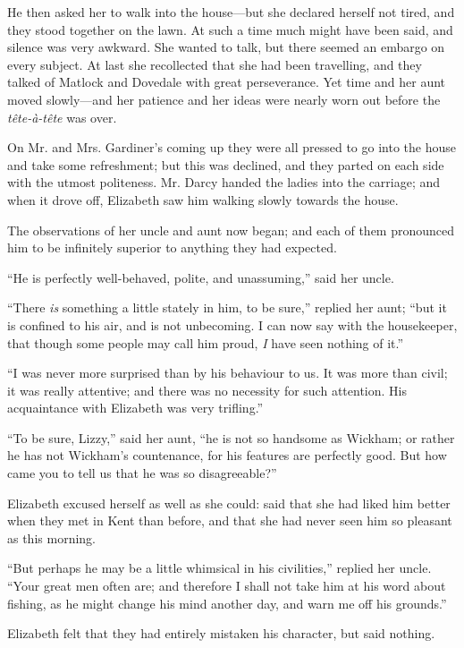 He then asked her to walk into the house---but she declared herself not tired, and they stood together on the lawn. At such a time much might have been said, and silence was very awkward. She wanted to talk, but there seemed an embargo on every subject. At last she recollected that she had been travelling, and they talked of Matlock and Dovedale with great perseverance. Yet time and her aunt moved slowly---and her patience and her ideas were nearly worn out before the \textit{tête-à-tête} was over.

On Mr. and Mrs. Gardiner's coming up they were all pressed to go into the house and take some refreshment; but this was declined, and they parted on each side with the utmost politeness. Mr. Darcy handed the ladies into the carriage; and when it drove off, Elizabeth saw him walking slowly towards the house.

The observations of her uncle and aunt now began; and each of them pronounced him to be infinitely superior to anything they had expected.

``He is perfectly well-behaved, polite, and unassuming,'' said her uncle.

``There \textit{is} something a little stately in him, to be sure,'' replied her aunt; ``but it is confined to his air, and is not unbecoming. I can now say with the housekeeper, that though some people may call him proud, \textit{I} have seen nothing of it.''

``I was never more surprised than by his behaviour to us. It was more than civil; it was really attentive; and there was no necessity for such attention. His acquaintance with Elizabeth was very trifling.''

``To be sure, Lizzy,'' said her aunt, ``he is not so handsome as Wickham; or rather he has not Wickham's countenance, for his features are perfectly good. But how came you to tell us that he was so disagreeable?''

Elizabeth excused herself as well as she could: said that she had liked him better when they met in Kent than before, and that she had never seen him so pleasant as this morning.

``But perhaps he may be a little whimsical in his civilities,'' replied her uncle. ``Your great men often are; and therefore I shall not take him at his word about fishing, as he might change his mind another day, and warn me off his grounds.''

Elizabeth felt that they had entirely mistaken his character, but said nothing.

